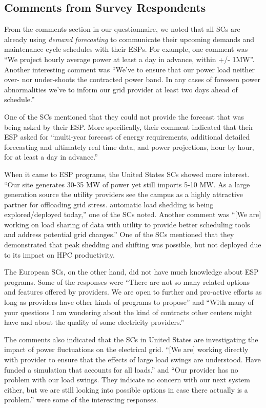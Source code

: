 \subsection{Comments from Survey Respondents}
\label{comm}
From the comments section in our questionnaire, we noted that all SCs are already using \emph{demand forecasting} to communicate their upcoming demands and maintenance cycle schedules with their ESPs. For example, one comment was ``We project hourly average power at least a day in advance, within +/- 1MW''. Another interesting comment was ``We've to ensure that our power load neither over- nor under-shoots the contracted power band. In any cases of foreseen power abnormalities we've to inform our grid provider at least two days ahead of schedule.''

One of the SCs mentioned that they could not provide the forecast that was being asked by their ESP. More specifically, their comment indicated that their ESP asked for ``multi-year forecast of energy requirements, additional detailed forecasting and ultimately real time data, and power projections, hour by hour, for at least a day in advance.''

When it came to ESP programs, the United States SCs showed more interest. ``Our site generates 30-35 MW of power yet still imports 5-10 MW. As a large generation source the utility providers see the campus as a highly attractive partner for offloading grid stress. automatic load shedding is being explored/deployed today,'' one of the SCs noted. Another comment was ``[We are] working on load sharing of data with utility to provide better scheduling tools and address potential grid changes.'' One of the SCs mentioned that they demonstrated that peak shedding and shifting was possible, but not deployed due to its impact on HPC productivity. 

The European SCs, on the other hand, did not have much knowledge about ESP programs. Some of the responses were ``There are not so many related options and features offered by providers. We are open to further and pro-active efforts as long as providers have other kinds of programs to propose'' and ``With many of your questions I am wondering about the kind of contracts other centers might have and about the quality of some electricity providers.''

The comments also indicated that the SCs in United States are investigating the impact of power fluctuations on the electrical grid. ``[We are] working directly with provider to ensure that the effects of large load swings are understood. Have funded a simulation that accounts for all loads.'' and ``Our provider has no problem with our load swings. They indicate no concern with our next system either, but we are still looking into possible options in case there actually is a problem.'' were some of the interesting responses.
